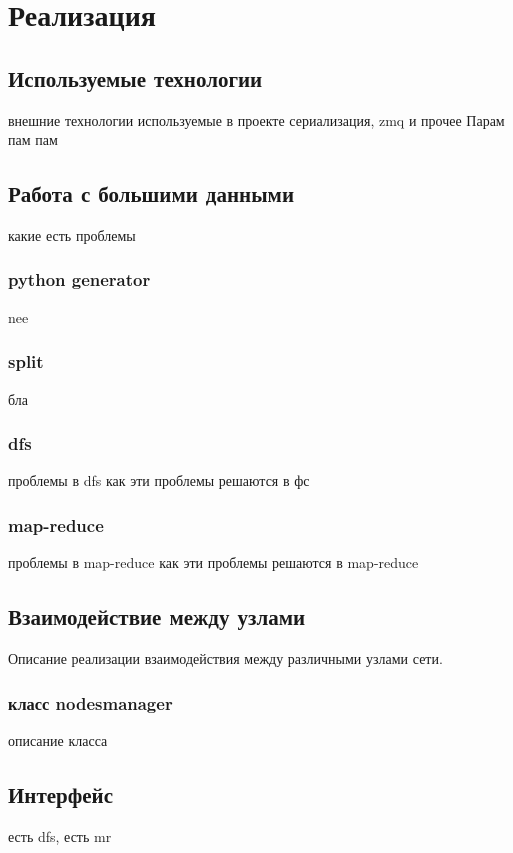 \documentclass[12pt,a4paper,oneside]{extarticle}
\begin{document}
\section{Реализация}
    \subsection{Используемые технологии}
        внешние технологии используемые в проекте
        сериализация, zmq и прочее
        Парам пам пам
    \clearpage

    \subsection{Работа с большими данными}
        какие есть проблемы
        \subsubsection{python generator}
            nee
        \subsubsection{split}
            бла

        \subsubsection{dfs}
            проблемы в dfs
            как эти проблемы решаются в фс
        \subsubsection{map-reduce}
            проблемы в map-reduce
            как эти проблемы решаются в map-reduce
    \clearpage 

    \subsection{Взаимодействие между узлами}
        Описание реализации взаимодействия между различными узлами сети.
        \subsubsection{класс nodesmanager}
            описание класса
    \clearpage

    \subsection{Интерфейс}
        есть dfs, есть mr
\end{document}
